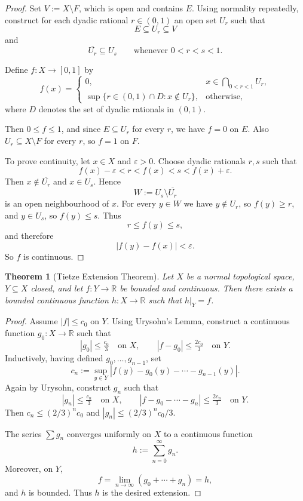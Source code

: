 \documentclass[12pt]{article}
\newtheorem{theorem}{Theorem}
\begin{document}
\begin{proof}
Set $V:=X\setminus F$, which is open and contains $E$. Using normality repeatedly, construct for each dyadic rational $r\in(0,1)$ an open set $U_r$ such that
\[
E\subseteq U_r \subseteq V
\]
and
\[
\overline{U_r}\subseteq U_s \qquad \text{whenever } 0<r<s<1.
\]

Define $f:X\to[0,1]$ by
\[
f(x)=
\begin{cases}
0, & x\in \bigcap_{0<r<1} U_r,\\[1mm]
\sup\{r\in(0,1)\cap D : x\notin U_r\}, & \text{otherwise},
\end{cases}
\]
where $D$ denotes the set of dyadic rationals in $(0,1)$.

Then $0\le f\le 1$, and since $E\subseteq U_r$ for every $r$, we have $f=0$ on $E$. Also $U_r\subseteq X\setminus F$ for every $r$, so $f=1$ on $F$.

To prove continuity, let $x\in X$ and $\varepsilon>0$. Choose dyadic rationals $r,s$ such that
\[
f(x)-\varepsilon < r < f(x) < s < f(x)+\varepsilon.
\]
Then $x\notin \overline{U_r}$ and $x\in U_s$. Hence
\[
W:=U_s\setminus \overline{U_r}
\]
is an open neighbourhood of $x$. For every $y\in W$ we have $y\notin U_r$, so $f(y)\ge r$, and $y\in U_s$, so $f(y)\le s$. Thus
\[
r\le f(y)\le s,
\]
and therefore
\[
|f(y)-f(x)|<\varepsilon.
\]
So $f$ is continuous.
\end{proof}

\begin{theorem}[Tietze Extension Theorem]
Let $X$ be a normal topological space, $Y \subseteq X$ closed, and let 
$f:Y \to \mathbb{R}$ be bounded and continuous. Then there exists a bounded continuous function 
$h:X \to \mathbb{R}$ such that $h|_Y = f$.
\end{theorem}

\begin{proof}
Assume $|f|\le c_0$ on $Y$. Using Urysohn's Lemma, construct a continuous function $g_0:X\to\mathbb{R}$ such that
\[
|g_0|\le \tfrac{c_0}{3} \quad \text{on } X, \qquad |f-g_0|\le \tfrac{2c_0}{3} \quad \text{on } Y.
\]
Inductively, having defined $g_0,\dots,g_{n-1}$, set
\[
c_n := \sup_{y\in Y} |f(y)-g_0(y)-\cdots-g_{n-1}(y)|.
\]
Again by Urysohn, construct $g_n$ such that
\[
|g_n|\le \tfrac{c_n}{3} \quad \text{on } X, \qquad 
|f-g_0-\cdots-g_n|\le \tfrac{2c_n}{3} \quad \text{on } Y.
\]
Then $c_n \le (2/3)^n c_0$ and $|g_n|\le (2/3)^n c_0/3$.

The series $\sum g_n$ converges uniformly on $X$ to a continuous function
\[
h := \sum_{n=0}^\infty g_n.
\]
Moreover, on $Y$,
\[
f = \lim_{n\to\infty} (g_0+\cdots+g_n) = h,
\]
and $h$ is bounded. Thus $h$ is the desired extension.
\end{proof}
\end{document}
